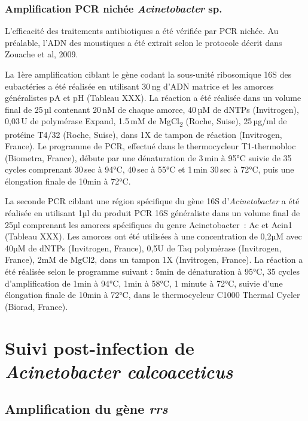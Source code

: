\subsubsection{Amplification PCR nichée \textit{Acinetobacter} sp.}

L’efficacité des traitements antibiotiques a été vérifiée par PCR nichée.
Au préalable, l’ADN des moustiques a été extrait selon le protocole décrit dans Zouache et al, 2009.

La 1ère amplification ciblant le gène codant la sous-unité ribosomique 16S des eubactéries a été réalisée en utilisant 30\,ng d’ADN matrice et les amorces généralistes pA et pH (Tableau XXX).
La réaction a été réalisée dans un volume final de 25\,µl contenant 20\,nM de chaque amorce, 40\,µM de dNTPs (Invitrogen), 0,03\,U de polymérase Expand, 1.5\,mM de MgCl\textsubscript{2} (Roche, Suise), 25\,µg/ml de protéine T4/32 (Roche, Suise), dans 1X de tampon de réaction (Invitrogen, France).
Le programme de PCR, effectué dans le thermocycleur T1-thermobloc (Biometra, France), débute par une dénaturation de 3\,min à 95°C suivie de 35 cycles comprenant 30\,sec à 94°C, 40\,sec à 55°C et 1\,min 30\,sec à 72°C, puis une élongation finale de 10min à 72°C.

La seconde PCR ciblant une région spécifique du gène 16S d’\textit{Acinetobacter} a été réalisée en utilisant 1µl du produit PCR 16S généraliste dans un volume final de 25µl comprenant les amorces spécifiques du genre Acinetobacter~: Ac et Acin1 (Tableau XXX). Les amorces ont été utilisées à une concentration de 0,2µM avec 40µM de dNTPs (Invitrogen, France), 0,5U de Taq polymérase (Invitrogen, France), 2mM de MgCl2, dans un tampon 1X (Invitrogen, France). La réaction a été réalisée selon le programme suivant : 5min de dénaturation à 95°C, 35 cycles d’amplification de 1min à 94°C, 1min à 58°C, 1 minute à 72°C, suivie d’une élongation finale de 10min à 72°C, dans le thermocycleur C1000 Thermal Cycler (Biorad, France).

\section{Suivi post-infection de \textit{Acinetobacter calcoaceticus}}

\subsection{Amplification du gène \textit{rrs}}

